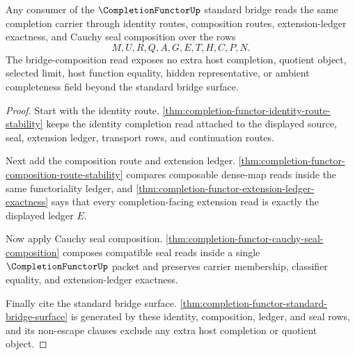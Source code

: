 \begin{theorem}
\label{thm:completion-functor-bridge-composition-exactness}
Any consumer of the $\CompletionFunctorUp$ standard bridge reads the same completion carrier through identity routes, composition routes, extension-ledger exactness, and Cauchy seal composition over the rows
$$
M,U,R,Q,A,G,E,T,H,C,P,N.
$$
The bridge-composition read exposes no extra host completion, quotient object, selected limit, host function equality, hidden representative, or ambient completeness field beyond the standard bridge surface.
\end{theorem}
\begin{proof}
Start with the identity route. \autoref{thm:completion-functor-identity-route-stability} keeps the identity completion read attached to the displayed source, seal, extension ledger, transport rows, and continuation routes.

Next add the composition route and extension ledger. \autoref{thm:completion-functor-composition-route-stability} compares composable dense-map reads inside the same functoriality ledger, and \autoref{thm:completion-functor-extension-ledger-exactness} says that every completion-facing extension read is exactly the displayed ledger $E$.

Now apply Cauchy seal composition. \autoref{thm:completion-functor-cauchy-seal-composition} composes compatible seal reads inside a single $\CompletionFunctorUp$ packet and preserves carrier membership, classifier equality, and extension-ledger exactness.

Finally cite the standard bridge surface. \autoref{thm:completion-functor-standard-bridge-surface} is generated by these identity, composition, ledger, and seal rows, and its non-escape clauses exclude any extra host completion or quotient object.
\end{proof}


